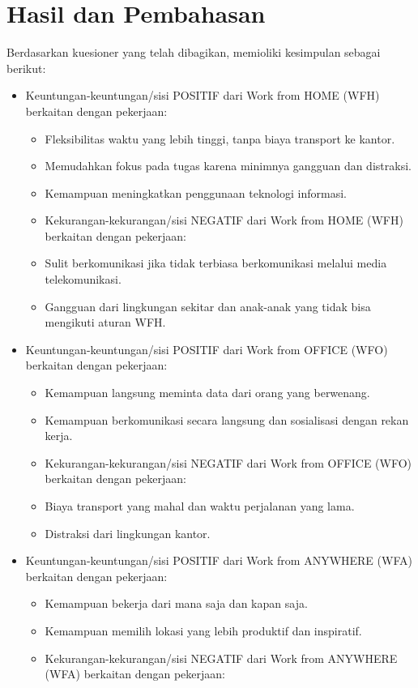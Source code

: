 \documentclass[review]{elsarticle}
\begin{document}
\section{Hasil dan Pembahasan}

Berdasarkan kuesioner yang telah dibagikan, memioliki kesimpulan sebagai berikut: 
\begin{itemize}
\item Keuntungan-keuntungan/sisi POSITIF dari Work from HOME (WFH) berkaitan dengan pekerjaan:
\begin{itemize}
\item Fleksibilitas waktu yang lebih tinggi, tanpa biaya transport ke kantor.
\item Memudahkan fokus pada tugas karena minimnya gangguan dan distraksi.
\item Kemampuan meningkatkan penggunaan teknologi informasi.
\item Kekurangan-kekurangan/sisi NEGATIF dari Work from HOME (WFH) berkaitan dengan pekerjaan:
\item Sulit berkomunikasi jika tidak terbiasa berkomunikasi melalui media telekomunikasi.
\item Gangguan dari lingkungan sekitar dan anak-anak yang tidak bisa mengikuti aturan WFH.
\end{itemize}
\item Keuntungan-keuntungan/sisi POSITIF dari Work from OFFICE (WFO) berkaitan dengan pekerjaan:
\begin{itemize}
\item Kemampuan langsung meminta data dari orang yang berwenang.
\item Kemampuan berkomunikasi secara langsung dan sosialisasi dengan rekan kerja.
\item Kekurangan-kekurangan/sisi NEGATIF dari Work from OFFICE (WFO) berkaitan dengan pekerjaan:
\item Biaya transport yang mahal dan waktu perjalanan yang lama.
\item Distraksi dari lingkungan kantor.
\end{itemize}
\item Keuntungan-keuntungan/sisi POSITIF dari Work from ANYWHERE (WFA) berkaitan dengan pekerjaan:
\begin{itemize}
\item Kemampuan bekerja dari mana saja dan kapan saja.
\item Kemampuan memilih lokasi yang lebih produktif dan inspiratif.
\item Kekurangan-kekurangan/sisi NEGATIF dari Work from ANYWHERE (WFA) berkaitan dengan pekerjaan:

\end{itemize}
\end{itemize}
\end{document}
